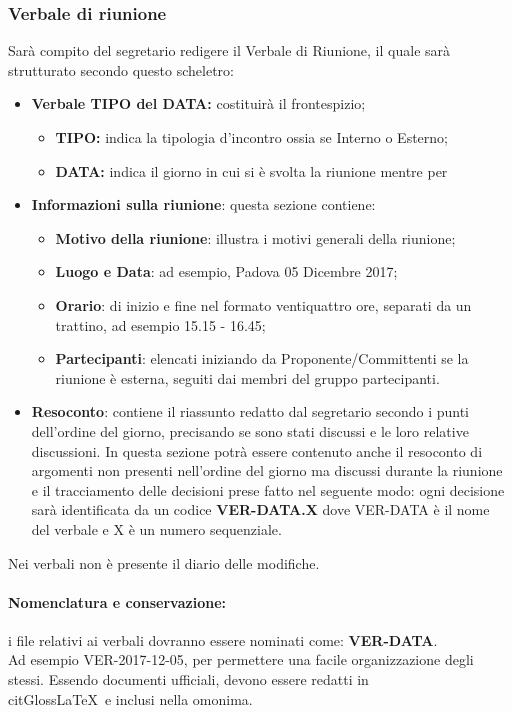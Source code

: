 \documentclass[NormeDiProgetto.tex]{subfiles}
\begin{document}
	\subsubsection{Verbale di riunione}
	Sarà compito del segretario redigere il Verbale di Riunione, il quale sarà strutturato secondo questo scheletro:
	\begin{itemize}
		\item \textbf{Verbale TIPO del DATA:} costituirà il frontespizio;
		\begin{itemize}
			\item \textbf{TIPO:} indica la tipologia d'incontro ossia se Interno o Esterno;
			\item \textbf{DATA:} indica il giorno in cui si è svolta la riunione mentre per 
		\end{itemize}
		\item \textbf{Informazioni sulla riunione}: questa sezione contiene:
		\begin{itemize}
			\item \textbf{Motivo della riunione}: illustra i motivi generali della riunione; 
			\item \textbf{Luogo e Data}: ad esempio, Padova 05 Dicembre 2017;
			\item \textbf{Orario}: di inizio e fine nel formato ventiquattro ore, separati da un trattino, ad esempio 15.15 - 16.45;
			\item \textbf{Partecipanti}: elencati iniziando da Proponente/Committenti se la riunione è esterna, seguiti dai membri del gruppo partecipanti.			
		\end{itemize}
			\item \textbf{Resoconto}: contiene il riassunto redatto dal segretario secondo i punti dell'ordine del giorno, precisando se sono stati discussi e le loro relative discussioni. In questa sezione potrà essere contenuto anche il resoconto di argomenti non presenti nell'ordine del giorno ma discussi durante la riunione e il tracciamento delle decisioni prese fatto nel seguente modo: ogni decisione sarà identificata da un codice \textbf{VER-DATA.X} dove VER-DATA è il nome del verbale e X è un numero sequenziale.
	\end{itemize}
	Nei verbali non è presente il diario delle modifiche.
	\paragraph{Nomenclatura e conservazione:} i file relativi ai verbali dovranno essere nominati come: \textbf{VER-DATA}.\\
	Ad esempio VER-2017-12-05, per permettere una facile organizzazione degli stessi.
	Essendo documenti ufficiali, devono essere redatti in \\citGloss{LaTeX}\ e inclusi nella  omonima.
	
\end{document}
